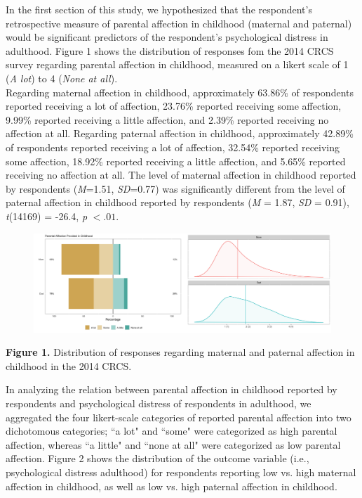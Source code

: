 \documentclass[12pt,letterpaper]{article}
\begin{document}

In the first section of this study, we hypothesized that the respondent's retrospective measure of parental affection in childhood (maternal and paternal) would be significant predictors of the respondent's psychological distress in adulthood. Figure 1 shows the distribution of responses fom the 2014 CRCS survey regarding parental affection in childhood, measured on a likert scale of 1 (\textit {A lot}) to 4 (\textit{None at all}). \\
\indent Regarding maternal affection in childhood, approximately 63.86\% of respondents reported receiving a lot of affection,  23.76\% reported receiving some affection, 9.99\% reported receiving a little affection, and 2.39\% reported receiving no affection at all. Regarding paternal affection in childhood, approximately 42.89\% of respondents reported receiving a lot of affection,  32.54\% reported receiving some affection, 18.92\% reported receiving a little affection, and 5.65\% reported receiving no affection at all. The level of maternal affection in childhood reported by respondents (\textit{M}=1.51, \textit{SD}=0.77) was significantly different from the level of paternal affection in childhood reported by respondents (\textit{M} = 1.87, \textit{SD} = 0.91), \textit{t}(14169) = -26.4, \textit{p} $<.01$.
\indent 

\begin{figure}[H]
	\centering
	\includegraphics[scale=0.3]{likert1.png}
\end{figure}	

\begin{center}
\singlespacing
\textbf{Figure 1.} Distribution of responses regarding maternal and paternal affection in childhood in the 2014 CRCS.
\end{center}

In analyzing the relation between parental affection in childhood reported by respondents and psychological distress of respondents in adulthood, we aggregated the four likert-scale categories of reported parental affection into two dichotomous categories; ``a lot" and ``some" were categorized as high parental affection, whereas ``a little" and ``none at all" were categorized as low parental affection. Figure 2 shows the distribution of the outcome variable (i.e., psychological distress adulthood) for respondents reporting low vs. high maternal affection in childhood, as well as low vs. high paternal affection in childhood. 
\end{document}
